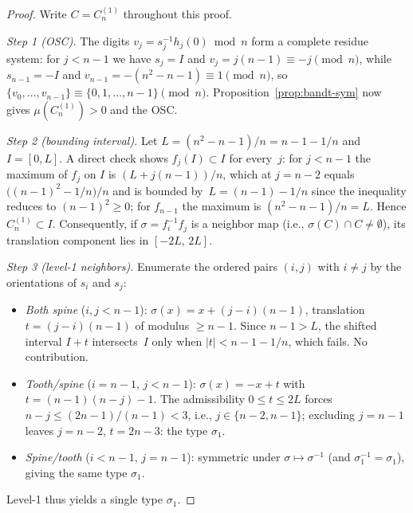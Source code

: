 \documentclass{amsart}
\theoremstyle{definition}
\theoremstyle{remark}
\begin{document}
\begin{proof}
Write $C=C_n^{(1)}$ throughout this proof.

\emph{Step 1 (OSC).}  The digits
$v_j = s_j^{-1} h_j(0) \bmod n$
form a complete residue system: for $j < n{-}1$ we have $s_j = I$
and $v_j = j(n{-}1) \equiv -j \pmod n$, while $s_{n-1} = -I$ and
$v_{n-1} = -(n^2{-}n{-}1) \equiv 1 \pmod n$, so
$\{v_0, \ldots, v_{n-1}\} \equiv \{0, 1, \ldots, n{-}1\} \pmod n$.
Proposition~\ref{prop:bandt-sym} now gives $\mu(C_n^{(1)}) > 0$
and the OSC.

\emph{Step 2 (bounding interval).}  Let
$L = (n^2{-}n{-}1)/n = n{-}1-1/n$ and $I = [0, L]$.  A direct
check shows $f_j(I) \subset I$ for every~$j$: for $j < n{-}1$ the
maximum of $f_j$ on $I$ is $(L + j(n{-}1))/n$, which at
$j = n{-}2$ equals $\bigl((n{-}1)^2 - 1/n\bigr)/n$ and is
bounded by~$L = (n{-}1) - 1/n$ since the inequality reduces to
$(n{-}1)^2 \ge 0$; for $f_{n-1}$ the
maximum is $(n^2{-}n{-}1)/n = L$.  Hence $C_n^{(1)} \subset I$.
Consequently, if $\sigma = f_i^{-1} f_j$ is a neighbor map
(i.e., $\sigma(C) \cap C \neq \emptyset$), its translation
component lies in $[-2L,\, 2L]$.

\emph{Step 3 (level-1 neighbors).}  Enumerate the ordered pairs
$(i, j)$ with $i \neq j$ by the orientations of $s_i$ and $s_j$:
\begin{itemize}
\item \emph{Both spine} ($i, j < n{-}1$):
  $\sigma(x) = x + (j{-}i)(n{-}1)$, translation
  $t = (j{-}i)(n{-}1)$ of modulus $\ge n{-}1$.  Since
  $n{-}1 > L$, the shifted interval $I + t$ intersects~$I$ only
  when $|t| < n{-}1-1/n$, which fails.  No contribution.
\item \emph{Tooth/spine} ($i = n{-}1$, $j < n{-}1$):
  $\sigma(x) = -x + t$ with
  $t = (n{-}1)(n{-}j) - 1$.  The admissibility
  $0 \le t \le 2L$ forces $n - j \le (2n{-}1)/(n{-}1) < 3$, i.e.,
  $j \in \{n{-}2, n{-}1\}$; excluding $j = n{-}1$ leaves $j = n{-}2$,
  $t = 2n{-}3$: the type $\sigma_1$.
\item \emph{Spine/tooth} ($i < n{-}1$, $j = n{-}1$): symmetric
  under $\sigma \mapsto \sigma^{-1}$ (and $\sigma_1^{-1} = \sigma_1$),
  giving the same type $\sigma_1$.
\end{itemize}
Level-1 thus yields a single type $\sigma_1$.


\end{proof}
\end{document}
